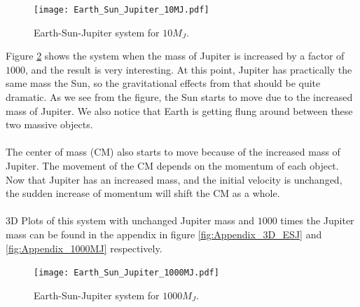 \documentclass{article}
\begin{document}
\begin{figure}[!h]
\centering
\texttt{[image: Earth\_Sun\_Jupiter\_10MJ.pdf]}
\caption{Earth-Sun-Jupiter system for $10M_J$.}
\label{ESJ_10MJ}
\end{figure}
Figure \ref{fig:ESJ_1000MJ} shows the system when the mass of Jupiter is increased by a factor of $1000$, and the result is very interesting. At this point, Jupiter has practically the same mass the Sun, so the gravitational effects from that should be quite dramatic. As we see from the figure, the Sun starts to move due to the increased mass of Jupiter. We also notice that Earth is getting flung around between these two massive objects. \\\\
The center of mass (CM) also starts to move because of the increased mass of Jupiter. The movement of the CM depends on the momentum of each object. Now that Jupiter has an increased mass, and the initial velocity is unchanged, the sudden increase of momentum will shift the CM as a whole. \\\\
3D Plots of this system with unchanged Jupiter mass and $1000$ times the Jupiter mass can be found in the appendix in figure \ref{fig:Appendix_3D_ESJ} and \ref{fig:Appendix_1000MJ} respectively. \\
\begin{figure}[!h]
\centering
\texttt{[image: Earth\_Sun\_Jupiter\_1000MJ.pdf]}
\caption{Earth-Sun-Jupiter system for $1000M_J$.}
\label{fig:ESJ_1000MJ}
\end{figure}

\FloatBarrier
\end{document}
